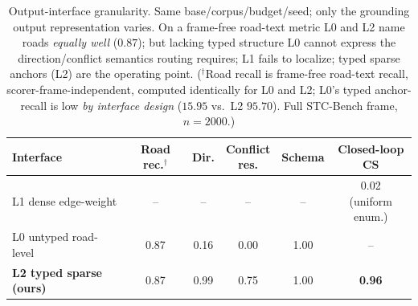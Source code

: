 \begin{table}[t]
\centering
\footnotesize
\caption{Output-interface granularity. Same base/corpus/budget/seed; only the grounding output
representation varies. On a frame-free road-text metric L0 and L2 name roads \emph{equally well}
($0.87$); but lacking typed structure L0 cannot express the direction/conflict semantics routing requires;
L1 fails to localize; typed sparse anchors (L2) are the operating point. ($^\dagger$Road recall is frame-free
road-text recall, scorer-frame-independent, computed identically for L0 and L2; L0's typed anchor-recall
is low \emph{by interface design} ($15.95$ vs.\ L2 $95.70$). Full STC-Bench frame, $n{=}2000$.)}
\label{tab:granularity}
\setlength{\tabcolsep}{2.5pt}
\begin{tabular}{@{}p{2.15cm}ccccc@{}}
\toprule
Interface & \shortstack{Road\\rec.$^\dagger$} & Dir. & \shortstack{Conflict\\res.} & Schema & \shortstack{Closed-loop\\CS} \\
\midrule
L1 dense edge-weight   & --    & --   & --   & --   & \shortstack{0.02\\(uniform enum.)} \\
L0 untyped road-level & 0.87 & 0.16 & 0.00 & 1.00 & -- \\
\textbf{L2 typed sparse (ours)}  & 0.87 & 0.99 & 0.75 & 1.00 & \textbf{0.96} \\
\bottomrule
\end{tabular}
\end{table}
